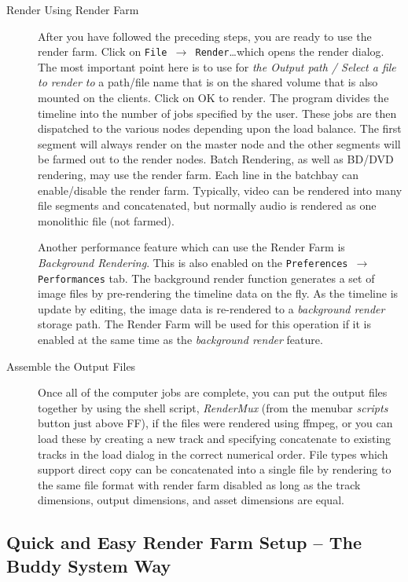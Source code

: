 \begin{description}
    \item[Render Using Render Farm] After you have followed the preceding steps, you are ready to use the render farm.  Click on \texttt{File $\rightarrow$ Render}\dots which opens the render dialog.  The most important point here is to use for \textit{the Output path / Select a file to render to} a path/file name that is on the shared volume that is also mounted on the clients.  Click on OK to render. The \CGG{} program divides the timeline into the number of jobs specified by the user.  These jobs are then dispatched to the various nodes depending upon the load balance. The first segment will always render on the master node and the other segments will be farmed out to the render nodes.  Batch Rendering, as well as BD/DVD rendering, may use the render farm.  Each line in the batchbay can enable/disable the render farm.  Typically, video can be rendered into many file segments and concatenated, but normally audio is rendered as one monolithic file (not farmed).
    
    Another performance feature which can use the Render Farm is \textit{Background Rendering}.  This is also enabled on the \texttt{Preferences $\rightarrow$ Performances} tab.  The background render function generates a set of image files by pre-rendering the timeline data on the fly.  As the timeline is update by editing, the image data is re-rendered to a \textit{background render} storage path.  The Render Farm will be used for this operation if it is enabled at the same time as the \textit{background render} feature.
    \item[Assemble the Output Files] Once all of the computer jobs are complete, you can put the output files together by using the shell script, \textit{RenderMux} (from the menubar \textit{scripts} button just above FF), if the files were rendered using ffmpeg, or you can load these by creating a new track and specifying concatenate to existing tracks in the load dialog in the correct numerical order.  File types which support direct copy can be concatenated into a single file by rendering to the same file format with render farm disabled as long as the track dimensions, output dimensions, and asset dimensions are equal.
\end{description}

\subsection{Quick and Easy Render Farm Setup – The Buddy System Way}%
\label{sub:buddy_system_way}

